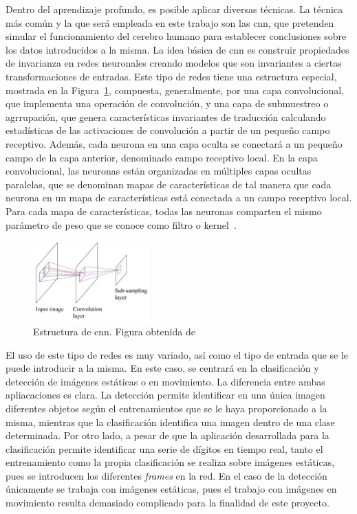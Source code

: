 Dentro del aprendizaje profundo, es posible aplicar diversas técnicas. La técnica más común y la que será empleada en este trabajo son las \acrfull{cnn}, que pretenden simular el funcionamiento del cerebro humano para establecer conclusiones sobre los datos introducidos a la misma. La idea básica de \acrshort{cnn} es construir propiedades de invarianza en redes neuronales creando modelos que son invariantes a ciertas transformaciones de entradas. Este tipo de redes tiene una estructura especial, mostrada en la Figura~\ref{fig.cnn}, compuesta, generalmente, por una capa convolucional, que implementa una operación de convolución, y una capa de submuestreo o agrrupación, que genera características invariantes de traducción calculando estadísticas de las activaciones de convolución a partir de un pequeño campo receptivo. Además, cada neurona en una capa oculta se conectará a un pequeño campo de la capa anterior, denominado campo receptivo local. En la capa convolucional, las neuronas están organizadas en múltiples capas ocultas paralelas, que se denominan mapas de características de tal manera que cada neurona en un mapa de características está conectada a un campo receptivo local. Para cada mapa de características, todas las neuronas comparten el mismo parámetro de peso que se conoce como filtro o kernel~\cite{cnn}.

\begin{figure}[H]
	\begin{center}
		\includegraphics[width=0.4\textwidth]{figures/cnn}
		\caption{Estructura de \acrshort{cnn}. Figura obtenida de~\cite{cnn}}
		\label{fig.cnn}
	\end{center}
\end{figure}

El uso de este tipo de redes es muy variado, así como el tipo de entrada que se le puede introducir a la misma. En este caso, se centrará en la clasificación y detección de imágenes estáticas o en movimiento. La diferencia entre ambas apliacaciones es clara. La detección permite identificar en una única imagen diferentes objetos según el entrenamientos que se le haya proporcionado a la misma, mientras que la clasificación identifica una imagen dentro de una clase determinada. Por otro lado, a pesar de que la aplicación desarrollada para la clasificación permite identificar una serie de dígitos en tiempo real, tanto el entrenamiento como la propia clasificación se realiza sobre imágenes estáticas, pues se introducen los diferentes \textit{frames} en la red. En el caso de la detección únicamente se trabaja con imágenes estáticas, pues el trabajo con imágenes en movimiento resulta demasiado complicado para la finalidad de este proyecto.\\

